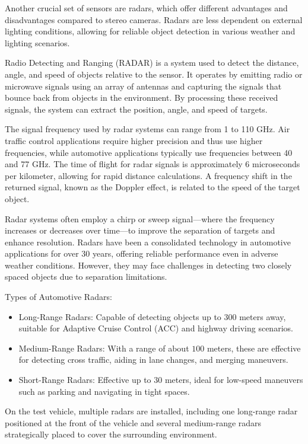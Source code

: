 Another crucial set of sensors are radars, which offer different advantages and disadvantages compared to stereo cameras. Radars are less dependent on external lighting conditions, allowing for reliable object detection in various weather and lighting scenarios.

Radio Detecting and Ranging (RADAR) is a system used to detect the distance, angle, and speed of objects relative to the sensor. It operates by emitting radio or microwave signals using an array of antennas and capturing the signals that bounce back from objects in the environment. By processing these received signals, the system can extract the position, angle, and speed of targets.

The signal frequency used by radar systems can range from 1 to 110 GHz. Air traffic control applications require higher precision and thus use higher frequencies, while automotive applications typically use frequencies between 40 and 77 GHz. The time of flight for radar signals is approximately 6 microseconds per kilometer, allowing for rapid distance calculations. A frequency shift in the returned signal, known as the Doppler effect, is related to the speed of the target object.

Radar systems often employ a chirp or sweep signal—where the frequency increases or decreases over time—to improve the separation of targets and enhance resolution. Radars have been a consolidated technology in automotive applications for over 30 years, offering reliable performance even in adverse weather conditions. However, they may face challenges in detecting two closely spaced objects due to separation limitations.

Types of Automotive Radars:
\begin{itemize}
    \item Long-Range Radars: Capable of detecting objects up to 300 meters away, suitable for Adaptive Cruise Control (ACC) and highway driving scenarios.
    \item Medium-Range Radars: With a range of about $100$ meters, these are effective for detecting cross traffic, aiding in lane changes, and merging maneuvers.
    \item Short-Range Radars: Effective up to $30$ meters, ideal for low-speed maneuvers such as parking and navigating in tight spaces.
\end{itemize}

On the test vehicle, multiple radars are installed, including one long-range radar positioned at the front of the vehicle and several medium-range radars strategically placed to cover the surrounding environment.

